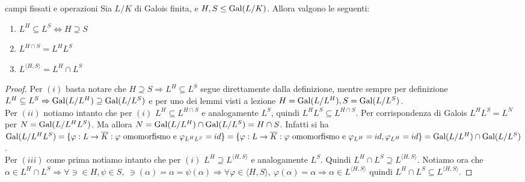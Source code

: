 \begin{theorem}{campi fissati e operazioni}
    Sia $L/K$ di Galois finita, e $H,S \leq \text{Gal}(L/K)$. Allora valgono le seguenti:
    \begin{enumerate}[label=($\roman*$)]
        \item $L^H \subseteq L^S \iff H \supseteq S$
        \item $L^{H\cap S} = L^HL^S$
        \item $L^{\langle H, S \rangle} = L^H \cap L^S$
    \end{enumerate}
    \begin{minipage}{0.5\textwidth}  
    \end{minipage}\hfill
    \begin{minipage}{0.5\textwidth}  
    \end{minipage}\hfill
\end{theorem}
\begin{proof}
 Per $(i)$ basta notare che $H \supseteq S \Rightarrow L^H \subseteq L^S$ segue direttamente dalla definizione, mentre sempre per definizione  $L^H \subseteq L^S \Rightarrow \text{Gal}(L/L^H) \supseteq \text{Gal}(L/L^S)$ e per uno dei lemmi visti a lezione $H = \text{Gal}(L/L^H), S = \text{Gal}(L/L^S)$. \\
Per $(ii)$ notiamo intanto che per $(i)$ $L^H \subseteq L^{H\cap S}$ e analogamente $L^S$, quindi $L^HL^S \subseteq L^{H\cap S}$. Per corrispondenza di Galois $L^HL^S = L^N$ per $N = \text{Gal}(L/L^HL^S)$. Ma allora $N = \text{Gal}(L/L^H) \cap \text{Gal}(L/L^S) = H \cap S$. Infatti si ha $\text{Gal}(L/L^HL^S) =  \{\varphi : L \rightarrow \overline{K} : \varphi \text{ omomorfismo e } \varphi_{L^HL^S} = id\} = \{\varphi : L \rightarrow \overline{K} : \varphi \text{ omomorfismo e }\varphi_{L^H} = id, \varphi_{L^H} = id\} = \text{Gal}(L/L^H) \cap \text{Gal}(L/L^S)$.\\
Per $(iii)$ come prima notiamo intanto che per $(i)$ $L^H \supseteq L^{\langle H, S \rangle}$ e analogamente $L^S$. Quindi $L^H \cap L^S \supseteq L^{\langle H, S \rangle}$. Notiamo ora che $\alpha \in L^H \cap L^S \Rightarrow \forall \ni \in H, \psi \in S, \ \ni(\alpha)=\alpha = \psi(\alpha) \Rightarrow \forall \varphi \in \langle H, S \rangle, \ \varphi(\alpha)=\alpha \Rightarrow \alpha \in L^{\langle H, S \rangle}$  quindi $L^H \cap L^S \subseteq L^{\langle H, S \rangle}$.
\end{proof}

